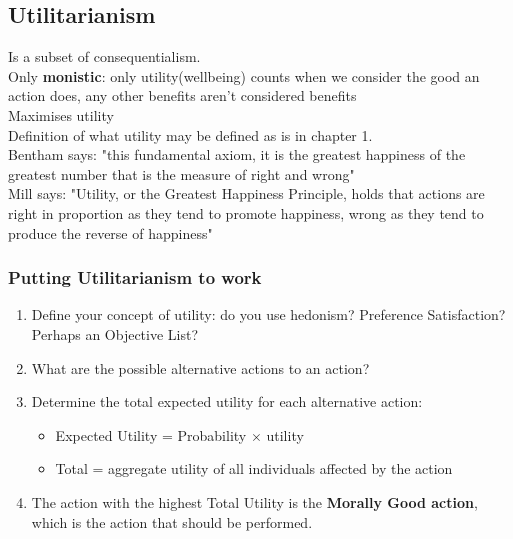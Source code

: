 \documentclass{article}
\begin{document}
    \subsection{Utilitarianism}
    Is a subset of consequentialism.
    \\Only \textbf{monistic}: only utility(wellbeing) counts when we consider the good an action does, any other benefits aren't considered benefits
    \\Maximises utility
    \\Definition of what utility may be defined as is in chapter 1.
    \\Bentham says: "this fundamental axiom, it is the greatest happiness of the greatest number that is the measure of right and wrong"
    \\Mill says: "Utility, or the Greatest Happiness Principle, holds that actions are right in proportion as they tend to promote happiness, wrong as they tend to produce the reverse of happiness"
    
        \subsubsection{Putting Utilitarianism to work}
        \begin{enumerate}
            \item Define your concept of utility: do you use hedonism? Preference Satisfaction? Perhaps an Objective List?
            \item What are the possible alternative actions to an action?
            \item Determine the total expected utility for each alternative action:
            \begin{itemize}
                \item Expected Utility = Probability $\times$ utility
                \item Total = aggregate utility of all individuals affected by the action
            \end{itemize}{}
            \item The action with the highest Total Utility is the \textbf{Morally Good action}, which is the action that should be performed.
        \end{enumerate}{}
        
\end{document}
